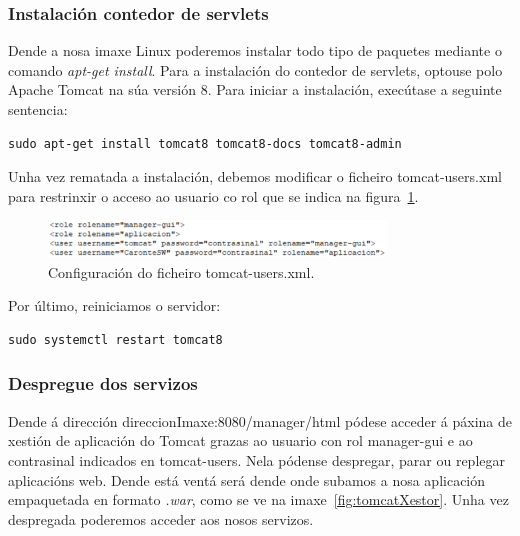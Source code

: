 \subsubsection{Instalación contedor de servlets}
Dende a nosa imaxe Linux poderemos instalar todo tipo de paquetes mediante o comando \emph{apt-get install}. Para a instalación do contedor de servlets, optouse polo Apache Tomcat na súa versión 8. Para iniciar a instalación, execútase a seguinte sentencia:

\begin{lstlisting}
sudo apt-get install tomcat8 tomcat8-docs tomcat8-admin
\end{lstlisting}

Unha vez rematada a instalación, debemos modificar o ficheiro tomcat-users.xml para restrinxir o acceso ao usuario co rol que se indica na figura~\ref{fig:tomcatUsers}.

\begin{figure}[h]
	\begin{center}
		\includegraphics[width=0.8\textwidth]{figures/capturas/tomcatUsers}
		\caption{Configuración do ficheiro tomcat-users.xml.}
		\label{fig:tomcatUsers}
	\end{center}
\end{figure}

Por último, reiniciamos o servidor:

\begin{lstlisting}
sudo systemctl restart tomcat8
\end{lstlisting}

\subsubsection{Despregue dos servizos}
Dende á dirección direccionImaxe:8080/manager/html pódese acceder á páxina de xestión de aplicación do Tomcat grazas ao usuario con rol manager-gui e ao contrasinal indicados en tomcat-users. Nela pódense despregar, parar ou replegar aplicacións web. Dende está ventá será dende onde subamos a nosa aplicación empaquetada en formato \emph{.war}, como se ve na imaxe~\ref{fig:tomcatXestor}. Unha vez despregada poderemos acceder aos nosos servizos.

